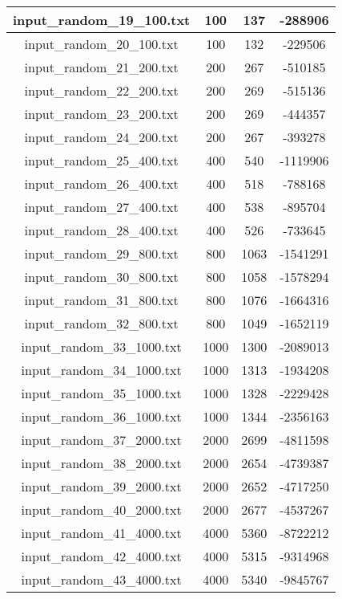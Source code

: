 \begin{longtable}{|c|c|c|c|}
		input\_random\_19\_100.txt & 100 & 137 & -288906
		 \\ \hline
		input\_random\_20\_100.txt & 100 & 132 & -229506
		 \\ \hline
		input\_random\_21\_200.txt & 200 & 267 & -510185
		 \\ \hline
		input\_random\_22\_200.txt & 200 & 269 & -515136
		 \\ \hline
		input\_random\_23\_200.txt & 200 & 269 & -444357
		 \\ \hline
		input\_random\_24\_200.txt & 200 & 267 & -393278
		 \\ \hline
		input\_random\_25\_400.txt & 400 & 540 & -1119906
		 \\ \hline
		input\_random\_26\_400.txt & 400 & 518 & -788168
		 \\ \hline
		input\_random\_27\_400.txt & 400 & 538 & -895704
		 \\ \hline
		input\_random\_28\_400.txt & 400 & 526 & -733645
		 \\ \hline
		input\_random\_29\_800.txt & 800 & 1063 & -1541291
		 \\ \hline
		input\_random\_30\_800.txt & 800 & 1058 & -1578294
		 \\ \hline
		input\_random\_31\_800.txt & 800 & 1076 & -1664316
		 \\ \hline
		input\_random\_32\_800.txt & 800 & 1049 & -1652119
		 \\ \hline
		input\_random\_33\_1000.txt & 1000 & 1300 & -2089013
		 \\ \hline
		input\_random\_34\_1000.txt & 1000 & 1313 & -1934208
		 \\ \hline
		input\_random\_35\_1000.txt & 1000 & 1328 & -2229428
		 \\ \hline
		input\_random\_36\_1000.txt & 1000 & 1344 & -2356163
		 \\ \hline
		input\_random\_37\_2000.txt & 2000 & 2699 & -4811598
		 \\ \hline
		input\_random\_38\_2000.txt & 2000 & 2654 & -4739387
		 \\ \hline
		input\_random\_39\_2000.txt & 2000 & 2652 & -4717250
		 \\ \hline
		input\_random\_40\_2000.txt & 2000 & 2677 & -4537267
		 \\ \hline
		input\_random\_41\_4000.txt & 4000 & 5360 & -8722212
		 \\ \hline
		input\_random\_42\_4000.txt & 4000 & 5315 & -9314968
		 \\ \hline
		input\_random\_43\_4000.txt & 4000 & 5340 & -9845767

\end{longtable}
